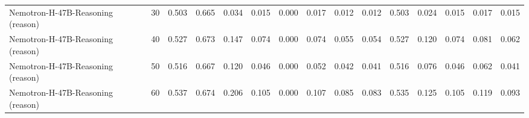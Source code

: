 \documentclass[acmsmall,screen,review,anonymous]{acmart}
\begin{document}
\begin{landscape}
\begin{longtable}{p{4.1cm}r*{13}{r}}
Nemotron-H-47B-Reasoning (reason) & 30 & 0.503 & 0.665 & 0.034 & 0.015 & 0.000 & 0.017 & 0.012 & 0.012 & 0.503 & 0.024 & 0.015 & 0.017 & 0.015 \\
Nemotron-H-47B-Reasoning (reason) & 40 & 0.527 & 0.673 & 0.147 & 0.074 & 0.000 & 0.074 & 0.055 & 0.054 & 0.527 & 0.120 & 0.074 & 0.081 & 0.062 \\
Nemotron-H-47B-Reasoning (reason) & 50 & 0.516 & 0.667 & 0.120 & 0.046 & 0.000 & 0.052 & 0.042 & 0.041 & 0.516 & 0.076 & 0.046 & 0.062 & 0.041 \\
Nemotron-H-47B-Reasoning (reason) & 60 & 0.537 & 0.674 & 0.206 & 0.105 & 0.000 & 0.107 & 0.085 & 0.083 & 0.535 & 0.125 & 0.105 & 0.119 & 0.093 \\
\end{longtable}
\end{landscape}
\end{document}
